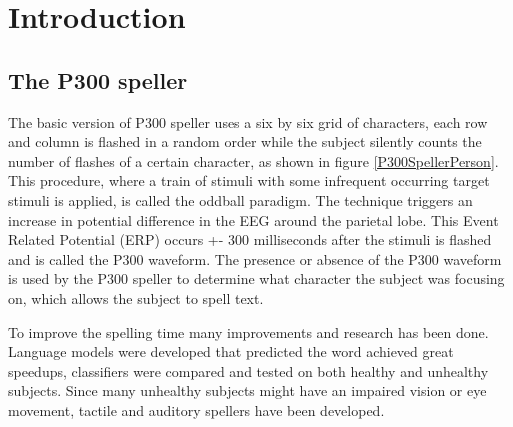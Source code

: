\chapter{Introduction}


\section{The P300 speller}
The basic version of P300 speller uses a six by six grid of characters, each row and column is flashed in a random order while the subject silently counts the number of flashes of a certain character, as shown in figure \ref{P300SpellerPerson}. This procedure, where a train of stimuli with some infrequent occurring target stimuli is applied, is called the oddball paradigm. The technique triggers an increase in potential difference in the EEG around the parietal lobe. This Event Related Potential (ERP) occurs +- 300 milliseconds after the stimuli is flashed and is called the P300 waveform\cite{ComparisonClassifications}. The presence or absence of the P300 waveform is used by the P300 speller to determine what character the subject was focusing on, which allows the subject to spell text. 


\clearpage

To improve the spelling time many improvements and research has been done. Language models were developed that predicted the word achieved great speedups\cite{LangModel}, classifiers were compared and tested on both healthy\cite{ClassTechniqueComp} and unhealthy subjects\cite{ComparisonClassifications}. Since many unhealthy subjects might have an impaired vision or eye movement, tactile\cite{TactileP300} and auditory\cite{AuditoryP300} spellers have been developed.

\npar

